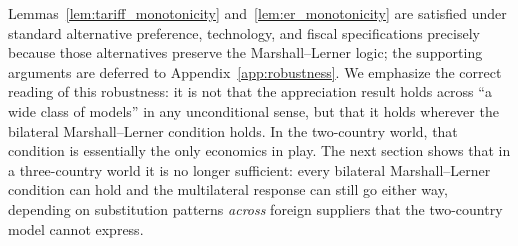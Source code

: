 \documentclass[11pt]{article}
\theoremstyle{plain}
\theoremstyle{remark}
\numberwithin{lemma}{section}
\numberwithin{proposition}{section}
\numberwithin{corollary}{section}
\newcommand{\rev}[1]{{\color{RevBlue}#1}}
\begin{document}
\rev{Lemmas~\ref{lem:tariff_monotonicity} and~\ref{lem:er_monotonicity} are satisfied under standard alternative preference, technology, and fiscal specifications precisely because those alternatives preserve the Marshall--Lerner logic; the supporting arguments are deferred to Appendix~\ref{app:robustness}. We emphasize the correct reading of this robustness: it is not that the appreciation result holds across ``a wide class of models'' in any unconditional sense, but that it holds wherever the bilateral Marshall--Lerner condition holds. In the two-country world, that condition is essentially the only economics in play. The next section shows that in a three-country world it is no longer sufficient: every bilateral Marshall--Lerner condition can hold and the multilateral response can still go either way, depending on substitution patterns \emph{across} foreign suppliers that the two-country model cannot express.}
\end{document}
